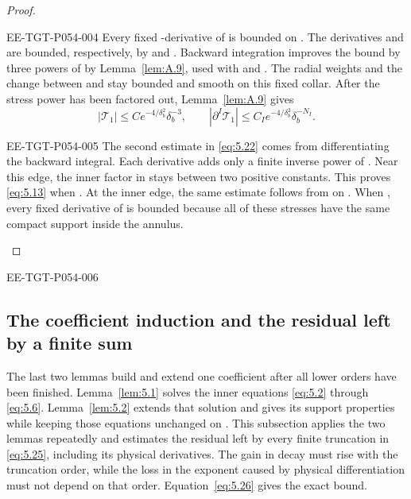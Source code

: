 \begin{proof}
\begin{EESegment}{EE-TGT-P054-004}
Every fixed -derivative of  is bounded on
. The derivatives  and
 are bounded, respectively, by
 and
. Backward integration improves the bound by three powers of
 by Lemma~\ref{lem:A.9}, used with  and
. The radial weights and the change between  and
 stay bounded and smooth on this fixed collar. After the stress power
 has been factored out, Lemma~\ref{lem:A.9} gives
\begin{equation}\label{eq:5.22}
|\mathcal T_1|\leq Ce^{-4/\delta_b^2}\delta_b^{-3},
\qquad
|\partial^I\mathcal T_1|\leq C_Ie^{-4/\delta_b^2}\delta_b^{-N_I}.
\tag{5.22}
\end{equation}
\end{EESegment}

\begin{EESegment}{EE-TGT-P054-005}
The second estimate in \eqref{eq:5.22} comes from differentiating the backward integral. Each derivative adds only a
finite inverse power of . Near this edge, the inner factor in
 stays between two positive constants. This proves \eqref{eq:5.13} when
. At the inner edge, the same estimate follows from
 on . When
, every fixed derivative of  is bounded because all
of these stresses have the same compact support inside the annulus.
\end{EESegment}
\end{proof}

\begin{EESegment}{EE-TGT-P054-006}
\subsection{The coefficient induction and the residual left by a finite sum}\label{sec:5.3}
The last two lemmas build and extend one coefficient after all lower orders have been finished. Lemma~\ref{lem:5.1} solves
the inner equations \eqref{eq:5.2} through \eqref{eq:5.6}. Lemma~\ref{lem:5.2} extends that solution and gives its support
properties while keeping those equations unchanged on . This subsection applies
the two lemmas repeatedly and estimates the residual left by every finite truncation in \eqref{eq:5.25}, including its
physical derivatives. The gain in decay must rise with the truncation order, while the loss in the exponent caused by
physical differentiation must not depend on that order. Equation~\eqref{eq:5.26} gives the exact bound.
\end{EESegment}
